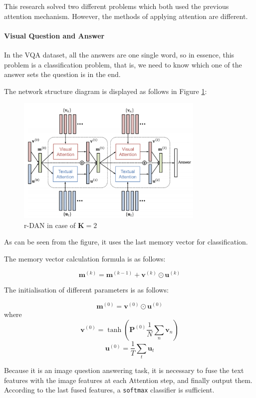 This research solved two different problems which both used the previous attention mechanism. However, the methods of applying attention are different.

\paragraph{Visual Question and Answer}

In the VQA dataset, all the answers are one single word, so in essence, this problem is a classification problem, that is, we need to know which one of the answer sets the question is in the end.

The network structure diagram is displayed as follows in Figure \ref{fig:dan2}:

\begin{figure}[h!]
\centering
\includegraphics[width=0.8\textwidth]{dan2.pdf}
\caption{r-DAN in case of $\mathbf{K}=2$ \cite{dan}}
\label{fig:dan2}
\end{figure}

As can be seen from the figure, it uses the last memory vector for classification.

The memory vector calculation formula is as follows:

$$
\mathbf{m}^{(k)}=\mathbf{m}^{(k-1)}+\mathbf{v}^{(k)} \odot \mathbf{u}^{(k)}
$$

The initialisation of different parameters is as follows:

$$
\mathbf{m}^{(0)}=\mathbf{v}^{(0)} \odot \mathbf{u}^{(0)}
$$
where
$$
\mathbf{v}^{(0)}=\tanh \left(\mathbf{P}^{(0)} \frac{1}{N} \sum_{n} \mathbf{v}_{n}\right)
$$
$$
\mathbf{u}^{(0)}=\frac{1}{T} \sum_{t} \mathbf{u}_{t}
$$

Because it is an image question answering task, it is necessary to fuse the text features with the image features at each Attention step, and finally output them. According to the last fused features, a \verb|softmax| classifier is sufficient.

